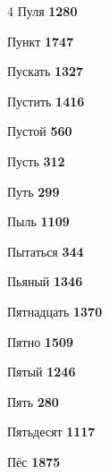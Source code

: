 \begin{multicols}{4}
\noindent Пуля \dotfill \textbf{\color{secondary} 1280}\par
\noindent Пункт \dotfill \textbf{\color{secondary} 1747}\par
\noindent Пускать \dotfill \textbf{\color{secondary} 1327}\par
\noindent Пустить \dotfill \textbf{\color{secondary} 1416}\par
\noindent Пустой \dotfill \textbf{\color{secondary} 560}\par
\noindent Пусть \dotfill \textbf{\color{secondary} 312}\par
\noindent Путь \dotfill \textbf{\color{secondary} 299}\par
\noindent Пыль \dotfill \textbf{\color{secondary} 1109}\par
\noindent Пытаться \dotfill \textbf{\color{secondary} 344}\par
\noindent Пьяный \dotfill \textbf{\color{secondary} 1346}\par
\noindent Пятнадцать \dotfill \textbf{\color{secondary} 1370}\par
\noindent Пятно \dotfill \textbf{\color{secondary} 1509}\par
\noindent Пятый \dotfill \textbf{\color{secondary} 1246}\par
\noindent Пять \dotfill \textbf{\color{secondary} 280}\par
\noindent Пятьдесят \dotfill \textbf{\color{secondary} 1117}\par
\noindent Пёс \dotfill \textbf{\color{secondary} 1875}\par


\end{multicols}
